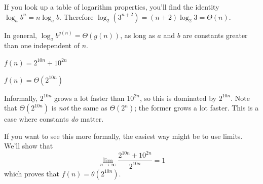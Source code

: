 \begin{prob}
\begin{subprobset}
\begin{subprob}
\begin{soln}
                If you look up a table of logarithm properties, you'll find
                the identity $\log_a b^n = n \log_a b$.  Therefore $\log_2(3^{n+2}) = (n+2) \log_2 3 = \Theta(n)$.

                In general, $\log_a b^{g(n)} = \Theta(g(n))$, as long as $a$ and $b$ are constants greater than one
                independent of $n$.
            \end{soln}
        \end{subprob}

        \begin{subprob}
            $f(n) = 2^{10n} + 10^{2n}$

            \begin{soln}
                $f(n) = \Theta(2^{10n})$

                Informally,
                $2^{10n}$ grows a lot faster than $10^{2n}$, so this is dominated by $2^{10n}$.
                Note that $\Theta(2^{10n})$ is \emph{not} the same as $\Theta(2^{n})$; the former
                grows a lot faster. This is a case where constants \emph{do} matter.

                If you want to see this more formally, the easiest way might be to use
                limits. We'll show that
                \[
                    \lim_{n \to \infty} \frac{2^{10n} + 10^{2n}}{2^{10n}} = 1
                \]
                which proves that $f(n) = \theta(2^{10n})$.


\end{soln}
\end{subprob}
\end{subprobset}
\end{prob}
